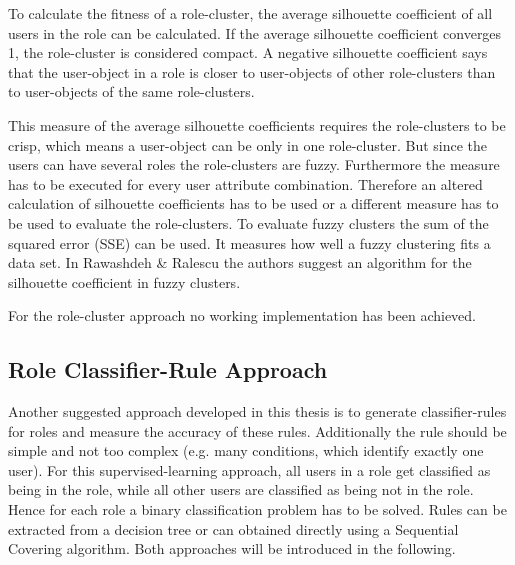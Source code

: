         To calculate the fitness of a role-cluster, the average silhouette coefficient of all users in the role can be calculated. If the average silhouette coefficient converges 1, the role-cluster is considered compact. A negative silhouette coefficient says that the user-object in a role is closer to user-objects of other role-clusters than to user-objects of the same role-clusters.
        
        This measure of the average silhouette coefficients requires the role-clusters to be crisp, which means a user-object can be only in one role-cluster. But since the users can have several roles the role-clusters are fuzzy. Furthermore the measure has to be executed for every user attribute combination. Therefore an altered calculation of silhouette coefficients has to be used or a different measure has to be used to evaluate the role-clusters. To evaluate fuzzy clusters the sum of the squared error (SSE) can be used\cite{Han}. It measures how well a fuzzy clustering fits a data set. In Rawashdeh \& Ralescu\cite{rawashdeh2012fuzzy} the authors suggest an algorithm for the silhouette coefficient in fuzzy clusters.
        
        For the role-cluster approach no working implementation has been achieved.
        
        \subsection{Role Classifier-Rule Approach}
        \label{sec:classifierRule}
        Another suggested approach developed in this thesis is to generate classifier-rules for roles and measure the accuracy of these rules. Additionally the rule should be simple and not too complex (e.g. many conditions, which identify exactly one user). For this supervised-learning approach, all users in a role get classified as being in the role, while all other users are classified as being not in the role. Hence for each role a binary classification problem has to be solved. Rules can be extracted from a decision tree or can obtained directly using a Sequential Covering algorithm\cite{Han}. Both approaches will be introduced in the following.
        

